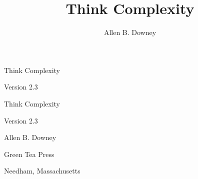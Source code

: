 \documentclass[12pt]{book}
\title{Think Complexity}
\author{Allen B. Downey}
\newcommand{\thetitle}{Think Complexity}
\newcommand{\theauthors}{Allen B. Downey}
\newcommand{\theversion}{2.3}
\theoremstyle{exercise}
\newcommand\blankpage{%
    \null
    \thispagestyle{empty}%
    \addtocounter{page}{-1}%
    \newpage}
\newif\ifplastex
\begin{document}
\frontmatter

\ifplastex

\maketitle

\else

\begin{latexonly}

\thispagestyle{empty}

\begin{flushright}
\vspace*{2.0in}

\begin{spacing}{3}
{\huge \thetitle}
\end{spacing}

\vspace{0.25in}

Version \theversion

\vfill

\end{flushright}


\afterpage{\blankpage}


\pagebreak
\thispagestyle{empty}

\begin{flushright}
\vspace*{2.0in}

\begin{spacing}{3}
{\huge \thetitle}
\end{spacing}

\vspace{0.25in}

Version \theversion

\vspace{1in}


{\Large
\theauthors \\
}


\vspace{0.5in}

{\Large Green Tea Press}

{\small Needham, Massachusetts}


\end{flushright}
\end{latexonly}
\end{document}
